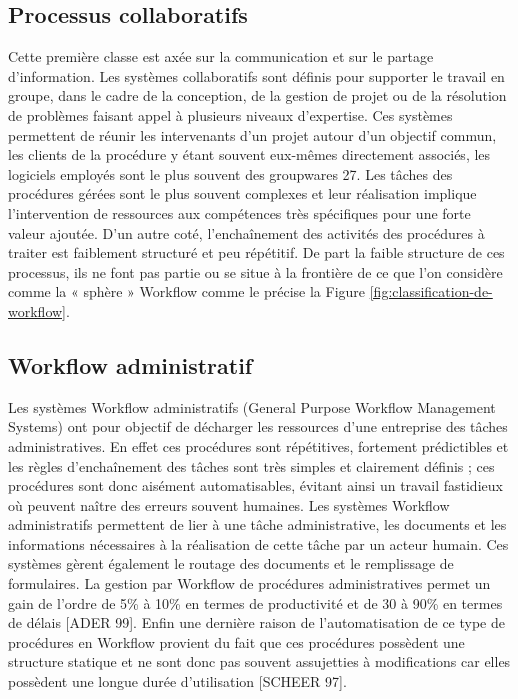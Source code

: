 \subsection{Processus collaboratifs }
Cette première classe est axée sur la communication et sur le partage d’information. Les systèmes collaboratifs sont définis pour supporter le travail en groupe, dans le cadre de la conception, de la gestion de projet ou de la résolution de problèmes faisant appel à plusieurs niveaux d’expertise. Ces systèmes permettent de réunir les intervenants d’un projet autour d’un objectif commun, les clients de la procédure y étant souvent eux-mêmes directement associés, les logiciels employés sont le plus souvent des groupwares
27. Les tâches des procédures gérées sont le plus souvent complexes et leur réalisation implique l’intervention de ressources aux compétences très spécifiques pour une forte valeur ajoutée. D’un autre coté, l’enchaînement des activités des procédures à traiter est faiblement structuré et peu répétitif.
De part la faible structure de ces processus, ils ne font pas partie ou se situe à la frontière de ce que l’on considère comme la « sphère » Workflow comme le précise la Figure \ref{fig:classification-de-workflow}. 

\subsection{Workflow administratif }
Les systèmes Workflow administratifs (General Purpose Workflow Management Systems) ont pour objectif de décharger les ressources d’une entreprise des tâches administratives. En effet ces procédures sont répétitives, fortement prédictibles et les règles
d’enchaînement des tâches sont très simples et clairement définis ; ces procédures sont donc
aisément automatisables, évitant ainsi un travail fastidieux où peuvent naître des erreurs souvent humaines. Les systèmes Workflow administratifs permettent de lier à une tâche administrative, les documents et les informations nécessaires à la réalisation de cette tâche par un acteur humain. Ces systèmes gèrent également le routage des documents et le remplissage de
formulaires. La gestion par Workflow de procédures administratives permet un gain de
l’ordre de 5\% à 10\% en termes de productivité et de 30 à 90\% en termes de délais [ADER
99]. Enfin une dernière raison de l’automatisation de ce type de procédures en Workflow provient du fait que ces procédures possèdent une structure statique et ne sont donc pas souvent
assujetties à modifications car elles possèdent une longue durée d’utilisation [SCHEER 97]. 
